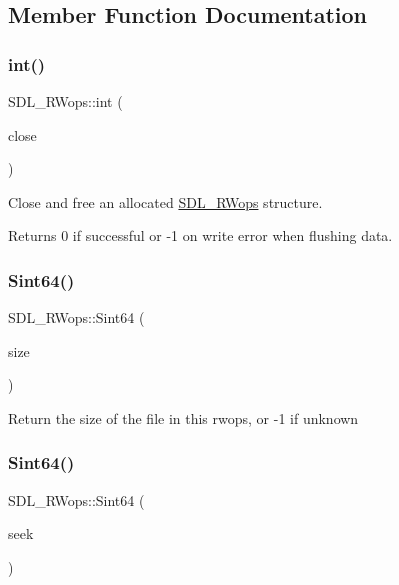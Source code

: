 \subsection{Member Function Documentation}
\mbox{\label{struct_s_d_l___r_wops_ab303bcbb0f6742a141ba8b2998923f47}} 
\subsubsection{\texorpdfstring{int()}{int()}}
{\footnotesize\ttfamily S\+D\+L\+\_\+\+R\+Wops\+::int (\begin{DoxyParamCaption}\item[{\mbox{\hyperlink{begin__code_8h_a81faf4ba0455dc75f2e0507eddb79401}{S\+D\+L\+C\+A\+LL}} $\ast$}]{close }\end{DoxyParamCaption})}

Close and free an allocated \mbox{\hyperlink{struct_s_d_l___r_wops}{S\+D\+L\+\_\+\+R\+Wops}} structure.

\begin{DoxyReturn}{Returns}
0 if successful or -\/1 on write error when flushing data. 
\end{DoxyReturn}
\mbox{\label{struct_s_d_l___r_wops_a45f66dbb683a88281d96f83ca18c525f}} 
\subsubsection{\texorpdfstring{Sint64()}{Sint64()}\hspace{0.1cm}{\footnotesize\ttfamily [1/2]}}
{\footnotesize\ttfamily S\+D\+L\+\_\+\+R\+Wops\+::\+Sint64 (\begin{DoxyParamCaption}\item[{\mbox{\hyperlink{begin__code_8h_a81faf4ba0455dc75f2e0507eddb79401}{S\+D\+L\+C\+A\+LL}} $\ast$}]{size }\end{DoxyParamCaption})}

Return the size of the file in this rwops, or -\/1 if unknown \mbox{\label{struct_s_d_l___r_wops_a767114391a3d1b4a7c214da3e164acf5}} 
\subsubsection{\texorpdfstring{Sint64()}{Sint64()}\hspace{0.1cm}{\footnotesize\ttfamily [2/2]}}
{\footnotesize\ttfamily S\+D\+L\+\_\+\+R\+Wops\+::\+Sint64 (\begin{DoxyParamCaption}\item[{\mbox{\hyperlink{begin__code_8h_a81faf4ba0455dc75f2e0507eddb79401}{S\+D\+L\+C\+A\+LL}} $\ast$}]{seek }\end{DoxyParamCaption})}

